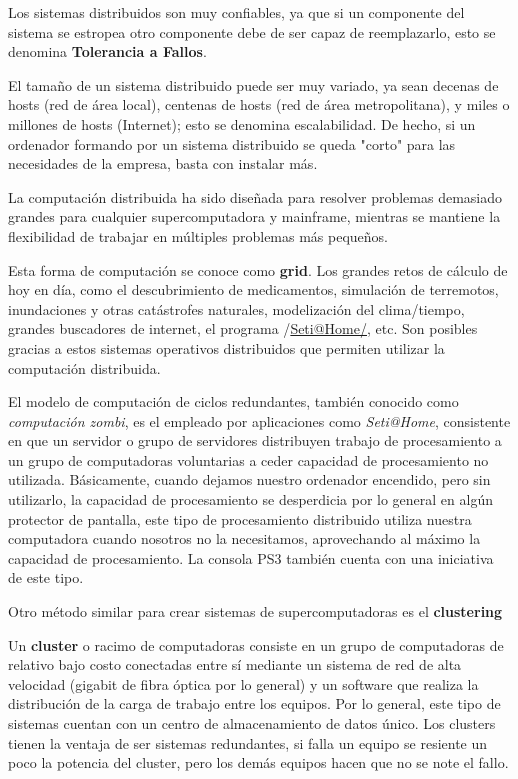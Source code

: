 \documentclass[11pt]{article}
\begin{document}
Los sistemas distribuidos son muy confiables, ya que si un componente
del sistema se estropea otro componente debe de ser capaz de
reemplazarlo, esto se denomina \textbf{Tolerancia a Fallos}.

El tamaño de un sistema distribuido puede ser muy variado, ya sean
decenas de hosts (red de área local), centenas de hosts (red de área
metropolitana), y miles o millones de hosts (Internet); esto se denomina
escalabilidad. De hecho, si un ordenador formando por un sistema
distribuido se queda "corto" para las necesidades de la empresa, basta
con instalar más.

La computación distribuida ha sido diseñada para resolver problemas
demasiado grandes para cualquier supercomputadora y mainframe, mientras
se mantiene la flexibilidad de trabajar en múltiples problemas más
pequeños.

Esta forma de computación se conoce como \textbf{grid}. Los grandes retos de
cálculo de hoy en día, como el descubrimiento de medicamentos,
simulación de terremotos, inundaciones y otras catástrofes naturales,
modelización del clima/tiempo, grandes buscadores de internet, el
programa /\href{http://setiweb.ssl.berkeley.edu/}{Seti@Home/}, etc. Son
posibles gracias a estos sistemas operativos distribuidos que permiten
utilizar la computación distribuida.

El modelo de computación de ciclos redundantes, también conocido como
\emph{computación zombi}, es el empleado por aplicaciones como \emph{Seti@Home},
consistente en que un servidor o grupo de servidores distribuyen trabajo
de procesamiento a un grupo de computadoras voluntarias a ceder
capacidad de procesamiento no utilizada. Básicamente, cuando dejamos
nuestro ordenador encendido, pero sin utilizarlo, la capacidad de
procesamiento se desperdicia por lo general en algún protector de
pantalla, este tipo de procesamiento distribuido utiliza nuestra
computadora cuando nosotros no la necesitamos, aprovechando al máximo la
capacidad de procesamiento. La consola PS3 también cuenta con una
iniciativa de este tipo.

Otro método similar para crear sistemas de supercomputadoras es el
\textbf{clustering}

Un \textbf{cluster} o racimo de computadoras consiste en un grupo de
computadoras de relativo bajo costo conectadas entre sí mediante un
sistema de red de alta velocidad (gigabit de fibra óptica por lo
general) y un software que realiza la distribución de la carga de
trabajo entre los equipos. Por lo general, este tipo de sistemas cuentan
con un centro de almacenamiento de datos único. Los clusters tienen la
ventaja de ser sistemas redundantes, si falla un equipo se resiente un
poco la potencia del cluster, pero los demás equipos hacen que no se
note el fallo.
\end{document}
